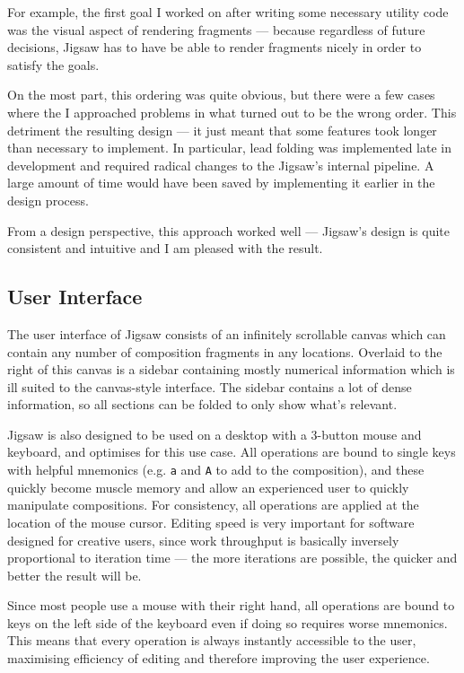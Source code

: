 \documentclass[12pt]{article}
\begin{document}
For example, the first goal I worked on after writing some necessary utility code was the visual
aspect of rendering fragments --- because regardless of future decisions, Jigsaw has to have be able
to render fragments nicely in order to satisfy the goals.

On the most part, this ordering was quite obvious, but there were a few cases where the I approached
problems in what turned out to be the wrong order.  This detriment the resulting design --- it just
meant that some features took longer than necessary to implement.  In particular, lead folding was
implemented late in development and required radical changes to the Jigsaw's internal pipeline.  A
large amount of time would have been saved by implementing it earlier in the design process.  

From a design perspective, this approach worked well --- Jigsaw's design is quite consistent and
intuitive and I am pleased with the result.

\subsection{User Interface}

The user interface of Jigsaw consists of an infinitely scrollable canvas which can contain any
number of composition fragments in any locations.  Overlaid to the right of this canvas is a sidebar
containing mostly numerical information which is ill suited to the canvas-style interface.  The
sidebar contains a lot of dense information, so all sections can be folded to only show what's
relevant.

Jigsaw is also designed to be used on a desktop with a 3-button mouse and keyboard, and optimises
for this use case.  All operations are bound to single keys with helpful mnemonics (e.g. \verb|a|
and \verb|A| to add to the composition), and these quickly become muscle memory and allow an
experienced user to quickly manipulate compositions.  For consistency, all operations are applied at
the location of the mouse cursor.  Editing speed is very important for software designed for
creative users, since work throughput is basically inversely proportional to iteration time --- the
more iterations are possible, the quicker and better the result will be.

Since most people use a mouse with their right hand, all operations are bound to keys on the left
side of the keyboard even if doing so requires worse mnemonics.  This means that every operation is
always instantly accessible to the user, maximising efficiency of editing and therefore improving
the user experience.
\end{document}
